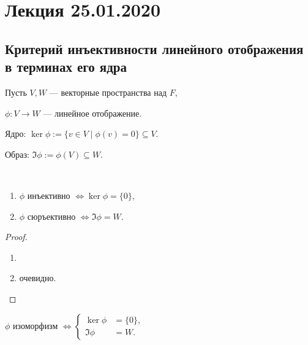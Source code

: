 \section{Лекция 25.01.2020}

\subsection{Критерий инъективности линейного отображения в терминах его ядра}

Пусть $V, W$ --- векторные пространства над $F$, 

$\phi : V \to W$ --- линейное отображение.

Ядро: $\ker \phi := \{v \in V \mid \phi(v) = 0\} \subseteq V$.

Образ: $\Im \phi := \phi(V) \subseteq W$.

\begin{proposal}~
    \begin{enumerate}[label=(\alph*)]
    \item $\phi$ инъективно $\iff \ker \phi = \{0\}$,
    \item $\phi$ сюръективно $\iff \Im \phi = W$.
    \end{enumerate}
\end{proposal}

\begin{proof}~
    \begin{enumerate}[label=(\alph*)]
    \item 
    \item очевидно.
        \qedhere
    \end{enumerate}
\end{proof}

\begin{corollary}
    $\phi$ изоморфизм
    \begin{math}
        \iff
        \left\{
        \begin{aligned}
            \ker \phi &= \{0\},\\
            \Im \phi &= W.
        \end{aligned}
        \right.
    \end{math}
\end{corollary}


